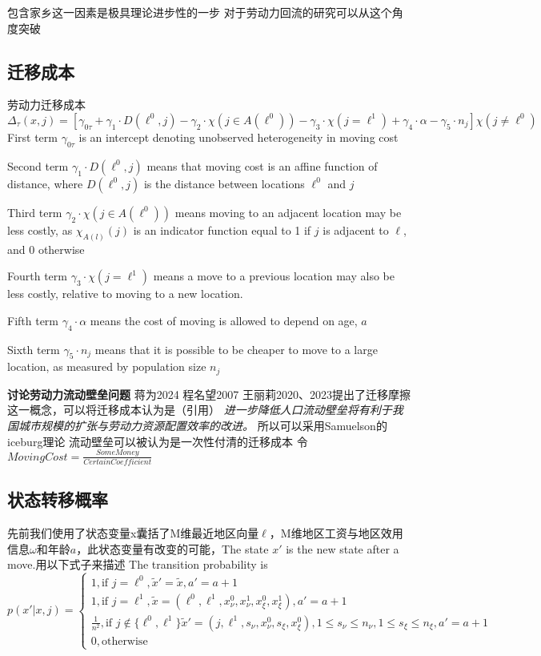 \documentclass{article}
\numberwithin{equation}{section} %
\begin{document}
包含家乡这一因素是极具理论进步性的一步 对于劳动力回流的研究可以从这个角度突破

\subsection{迁移成本}
劳动力迁移成本
$$\Delta_\tau(x, j) = [\gamma_{0 \tau}+\gamma_1 \cdot D(\ell^0,j)-\gamma_2 \cdot\chi(j\in A(\ell^0))-\gamma_3 \cdot\chi(j=\ell^1)+\gamma_4 \cdot\alpha-\gamma_5 \cdot n_j]\chi(j\neq \ell^0)$$
First term $\gamma_{0 \tau}$ is an intercept denoting unobserved heterogeneity in moving cost

Second term $\gamma_1 \cdot D(\ell^0,j)$ means that moving cost is an affine function of distance, where $D(\ell^0, j)$ is the distance between locations $\ell^0$ and $j$ 

Third term $\gamma_2 \cdot\chi(j\in A(\ell^0))$ means moving to an adjacent location may be less costly, as $\chi_{A(l)}(j)$ is an indicator function equal to 1 if $j$ is adjacent to $\ell$, and 0 otherwise

Fourth term $\gamma_3 \cdot\chi(j=\ell^1)$ means a move to a previous location may also be less costly, relative to moving to a new location.

Fifth term $\gamma_4 \cdot\alpha$ means the cost of moving is allowed to depend on age, $a$

Sixth term $\gamma_5 \cdot n_j$ means that it is possible to be cheaper to move to a large location, as measured by population size $n_j$

\textbf{讨论劳动力流动壁垒问题}
蒋为2024
程名望2007
王丽莉2020、2023提出了迁移摩擦这一概念，可以将迁移成本认为是（引用）
\textit{进一步降低人口流动壁垒将有利于我国城市规模的扩张与劳动力资源配置效率的改进。}
所以可以采用Samuelson的iceburg理论 流动壁垒可以被认为是一次性付清的迁移成本
令$MovingCost = \frac{SomeMoney}{CertainCoefficient}$


\subsection{状态转移概率}
先前我们使用了状态变量x囊括了M维最近地区向量$\ell$，M维地区工资与地区效用信息$\omega$和年龄$a$，此状态变量有改变的可能，The state $x'$ is the new state after a move.用以下式子来描述
The transition probability is 
\begin{equation}
  p(x'|x,j)=
  \begin{cases}
    1, \text{if }j=\ell^0,\tilde x'=\tilde x,a'=a+1
    \\
    1, \text{if }j=\ell^1,\tilde x =(\ell^0,\ell^1,x_\nu^0,x_\nu^1,x_\xi^0,x_\xi^1),a'=a+1
    \\
    \frac{1}{n^2}, \text{if }j \notin \{\ell^0,\ell^1\}\tilde x'=(j,\ell^1,s_\nu,x_\nu^0,s_\xi,x_\xi^0),1\leqslant s_\nu \leqslant n_\nu,1\leqslant s_\xi \leqslant n_\xi,a'=a+1
    \\
    0, \text{otherwise}
  \end{cases}
\end{equation}
\end{document}

